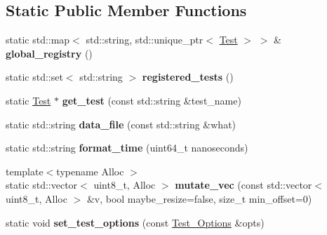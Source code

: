 \subsection*{Static Public Member Functions}
\begin{DoxyCompactItemize}
\item 
\mbox{\label{class_botan___tests_1_1_test_a84910cc52b9405d4ae78cc67db5a14bd}} 
static std\+::map$<$ std\+::string, std\+::unique\+\_\+ptr$<$ \mbox{\hyperlink{class_botan___tests_1_1_test}{Test}} $>$ $>$ \& {\bfseries global\+\_\+registry} ()
\item 
\mbox{\label{class_botan___tests_1_1_test_a296cdae6d3f8d42ec00b2197b4cd7ece}} 
static std\+::set$<$ std\+::string $>$ {\bfseries registered\+\_\+tests} ()
\item 
\mbox{\label{class_botan___tests_1_1_test_a9bf0868a6cb77fb62dcad75765ec75f1}} 
static \mbox{\hyperlink{class_botan___tests_1_1_test}{Test}} $\ast$ {\bfseries get\+\_\+test} (const std\+::string \&test\+\_\+name)
\item 
\mbox{\label{class_botan___tests_1_1_test_a3106ee5b939c0d31f359ca52de8013f0}} 
static std\+::string {\bfseries data\+\_\+file} (const std\+::string \&what)
\item 
\mbox{\label{class_botan___tests_1_1_test_a05161d3339b3abdbf6483c31aa9b5635}} 
static std\+::string {\bfseries format\+\_\+time} (uint64\+\_\+t nanoseconds)
\item 
\mbox{\label{class_botan___tests_1_1_test_a38104a854c931fdb5413a585f5573973}} 
{\footnotesize template$<$typename Alloc $>$ }\\static std\+::vector$<$ uint8\+\_\+t, Alloc $>$ {\bfseries mutate\+\_\+vec} (const std\+::vector$<$ uint8\+\_\+t, Alloc $>$ \&v, bool maybe\+\_\+resize=false, size\+\_\+t min\+\_\+offset=0)
\item 
\mbox{\label{class_botan___tests_1_1_test_ad2e70f1ba5c3c5c2ce1c0b4aa2d845f9}} 
static void {\bfseries set\+\_\+test\+\_\+options} (const \mbox{\hyperlink{class_botan___tests_1_1_test___options}{Test\+\_\+\+Options}} \&opts)

\end{DoxyCompactItemize}
